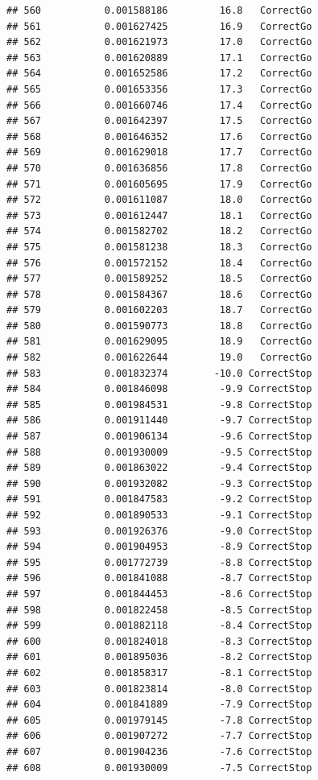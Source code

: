 \documentclass[
]{article}
\begin{document}
\begin{verbatim}
## 560           0.001588186         16.8   CorrectGo
## 561           0.001627425         16.9   CorrectGo
## 562           0.001621973         17.0   CorrectGo
## 563           0.001620889         17.1   CorrectGo
## 564           0.001652586         17.2   CorrectGo
## 565           0.001653356         17.3   CorrectGo
## 566           0.001660746         17.4   CorrectGo
## 567           0.001642397         17.5   CorrectGo
## 568           0.001646352         17.6   CorrectGo
## 569           0.001629018         17.7   CorrectGo
## 570           0.001636856         17.8   CorrectGo
## 571           0.001605695         17.9   CorrectGo
## 572           0.001611087         18.0   CorrectGo
## 573           0.001612447         18.1   CorrectGo
## 574           0.001582702         18.2   CorrectGo
## 575           0.001581238         18.3   CorrectGo
## 576           0.001572152         18.4   CorrectGo
## 577           0.001589252         18.5   CorrectGo
## 578           0.001584367         18.6   CorrectGo
## 579           0.001602203         18.7   CorrectGo
## 580           0.001590773         18.8   CorrectGo
## 581           0.001629095         18.9   CorrectGo
## 582           0.001622644         19.0   CorrectGo
## 583           0.001832374        -10.0 CorrectStop
## 584           0.001846098         -9.9 CorrectStop
## 585           0.001984531         -9.8 CorrectStop
## 586           0.001911440         -9.7 CorrectStop
## 587           0.001906134         -9.6 CorrectStop
## 588           0.001930009         -9.5 CorrectStop
## 589           0.001863022         -9.4 CorrectStop
## 590           0.001932082         -9.3 CorrectStop
## 591           0.001847583         -9.2 CorrectStop
## 592           0.001890533         -9.1 CorrectStop
## 593           0.001926376         -9.0 CorrectStop
## 594           0.001904953         -8.9 CorrectStop
## 595           0.001772739         -8.8 CorrectStop
## 596           0.001841088         -8.7 CorrectStop
## 597           0.001844453         -8.6 CorrectStop
## 598           0.001822458         -8.5 CorrectStop
## 599           0.001882118         -8.4 CorrectStop
## 600           0.001824018         -8.3 CorrectStop
## 601           0.001895036         -8.2 CorrectStop
## 602           0.001858317         -8.1 CorrectStop
## 603           0.001823814         -8.0 CorrectStop
## 604           0.001841889         -7.9 CorrectStop
## 605           0.001979145         -7.8 CorrectStop
## 606           0.001907272         -7.7 CorrectStop
## 607           0.001904236         -7.6 CorrectStop
## 608           0.001930009         -7.5 CorrectStop

\end{verbatim}
\end{document}
